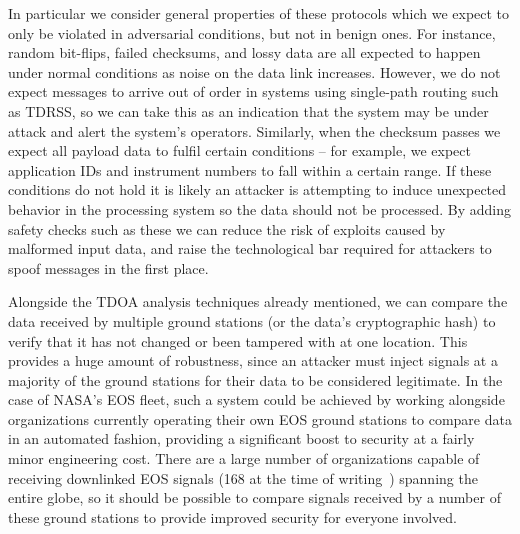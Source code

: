 In particular we consider general properties of these protocols which we expect to only be violated in adversarial conditions, but not in benign ones.
For instance, random bit-flips, failed checksums, and lossy data are all expected to happen under normal conditions as noise on the data link increases.
However, we do not expect messages to arrive out of order in systems using single-path routing such as TDRSS, so we can take this as an indication that the system may be under attack and alert the system's operators.
Similarly, when the checksum passes we expect all payload data to fulfil certain conditions -- for example, we expect application IDs and instrument numbers to fall within a certain range.
If these conditions do not hold it is likely an attacker is attempting to induce unexpected behavior in the processing system so the data should not be processed.
By adding safety checks such as these we can reduce the risk of exploits caused by malformed input data, and raise the technological bar required for attackers to spoof messages in the first place.



Alongside the TDOA analysis techniques already mentioned, we can compare the data received by multiple ground stations (or the data's cryptographic hash) to verify that it has not changed or been tampered with at one location.
This provides a huge amount of robustness, since an attacker must inject signals at a majority of the ground stations for their data to be considered legitimate.
In the case of NASA's EOS fleet, such a system could be achieved by working alongside organizations currently operating their own EOS ground stations to compare data in an automated fashion, providing a significant boost to security at a fairly minor engineering cost.
There are a large number of organizations capable of receiving downlinked EOS signals (168 at the time of writing~\cite{nasaDirect}) spanning the entire globe, so it should be possible to compare signals received by a number of these ground stations to provide improved security for everyone involved.


